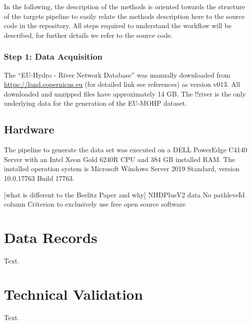 \documentclass[fleqn,10pt]{wlscirep}
\begin{document}
In the following, the description of the methods is oriented towards the structure of the targets pipeline to easily relate the methods description here to the source code in the repository. All steps required to understand the workflow will be described, for further details we refer to the source code.

\hypertarget{step-1-data-acquisition}{%
\subsubsection*{Step 1: Data Acquisition}\label{step-1-data-acquisition}}

The ``EU-Hydro - River Network Database'' was manually downloaded from \url{https://land.copernicus.eu} (for detailed link see references) as version v013. All downloaded and unzipped files have approximately 14 GB. The !!river is the only underlying data for the generation of the EU-MOHP dataset.

\hypertarget{hardware}{%
\subsection*{Hardware}\label{hardware}}

The pipeline to generate the data set was executed on a DELL PowerEdge C4140 Server with an Intel Xeon Gold 6240R CPU and 384 GB installed RAM. The installed operation system is Microsoft Windows Server 2019 Standard, version 10.0.17763 Build 17763.

{[}what is different to the Beelitz Paper and why{]}
NHDPlusV2 data
No pathleveId column
Criterion to exclusively use free open source software

\hypertarget{data-records}{%
\section*{Data Records}\label{data-records}}

Text.

\hypertarget{technical-validation}{%
\section*{Technical Validation}\label{technical-validation}}

Text.
\end{document}

